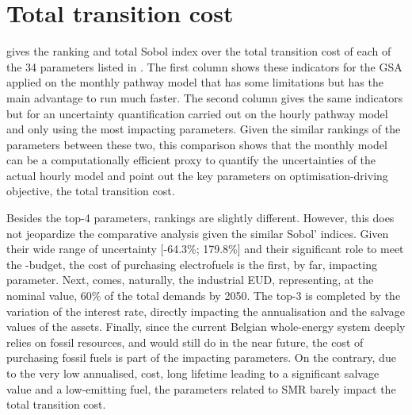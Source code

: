\section{Total transition cost}
\label{app:UQ_transition_cost}

 gives the ranking and total Sobol index over the total transition cost of each of the 34 parameters listed in . The first column shows these indicators for the \gls{GSA} applied on the monthly pathway model that has some limitations \cite{limpens2023pathway} but has the main advantage to run much faster. The second column gives the same indicators but for an uncertainty quantification carried out on the hourly pathway model and only using the most impacting parameters. Given the similar rankings of the parameters between these two, this comparison shows that the monthly model can be a computationally efficient proxy to quantify the uncertainties of the actual hourly model and point out the key parameters on optimisation-driving objective, the total transition cost. 

Besides the top-4 parameters, rankings are slightly different. However, this does not jeopardize the comparative analysis given the similar Sobol' indices. Given their wide range of uncertainty [-64.3\%; 179.8\%] and their significant role to meet the -budget, the cost of purchasing electrofuels is the first, by far, impacting parameter. Next, comes, naturally, the industrial \gls{EUD}, representing, at the nominal value, 60\% of the total demands by 2050. The top-3 is completed by the variation of the interest rate, directly impacting the annualisation and the salvage values of the assets. Finally, since the current Belgian whole-energy system deeply relies on fossil resources, and would still do in the near future, the cost of purchasing fossil fuels is part of the impacting parameters. On the contrary, due to the very low annualised, cost, long lifetime leading to a significant salvage value  and a low-emitting fuel, the parameters related to \gls{SMR} barely impact the total transition cost.

